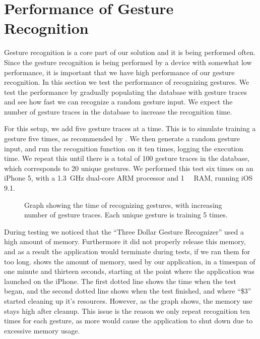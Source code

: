 \section{Performance of Gesture Recognition}\label{sec:gestureperformance}
Gesture recognition is a core part of our solution and it is being performed often. 
Since the gesture recognition is being performed by a device with somewhat low performance,
it is important that we have high performance of our gesture recognition. 
In this section we test the performance of recognizing gestures. 
We test the performance by gradually populating the database with gesture traces and see how fast we can recognize a random gesture input.
We expect the number of gesture traces in the database to increase the recognition time.

For this setup, we add five gesture traces at a time. 
This is to simulate training a gesture five times, 
as recommended by \cite{threedollar}. 
We then generate a random gesture input, 
and run the recognition function on it ten times, 
logging the execution time.
We repeat this until there is a total of \num{100} gesture traces in the database, 
which corresponds to \num{20} unique gestures.
We performed this test six times on an iPhone 5, 
with a \SI{1.3}{\giga\hertz} dual-core ARM processor and \SI{1}{\giga\byte} RAM, running iOS 9.1.

\begin{figure}[!htb]
    \centering
    
    \caption{Graph showing the time of recognizing gestures, with increasing number of gesture traces. Each unique gesture is training \num{5} times.}
    \label{fig:performancegraph}
\end{figure}

During testing we noticed that the ``Three Dollar Gesture Recognizer'' used a high amount of memory. 
Furthermore it did not properly release this memory, 
and as a result the application would terminate during tests, 
if we ran them for too long.
 shows the amount of memory, 
used by our application, 
in a timespan of one minute and thirteen seconds, 
starting at the point where the application was launched on the iPhone. 
The first dotted line shows the time when the test began, 
and the second dotted line shows when the test finished, 
and where ``\$3'' started cleaning up it's resources.
However, as the graph shows, the memory use stays high after cleanup. %
This issue is the reason we only repeat recognition ten times for each gesture, 
as more would cause the application to shut down due to excessive memory usage. %

